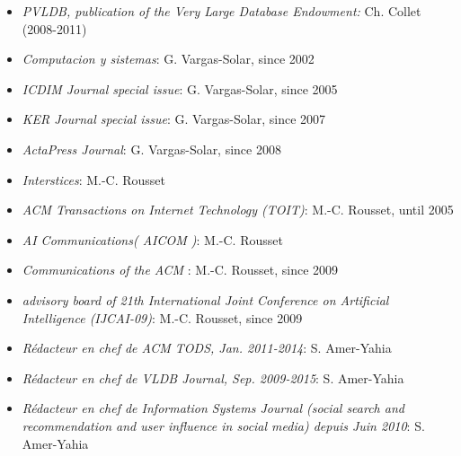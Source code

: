 \begin{itemize}
\setlength{\itemindent}{-0.5cm}
\setlength{\itemsep}{-0.1cm}
\item {\it PVLDB, publication of the Very Large Database Endowment:} Ch. Collet (2008-2011)

\item {\it Computacion y sistemas}: G. Vargas-Solar, since 2002

\item {\it ICDIM Journal special issue}: G. Vargas-Solar, since 2005

\item {\it KER Journal special issue}: G. Vargas-Solar, since 2007

\item {\it ActaPress Journal}: G. Vargas-Solar, since 2008

\item {\it Interstices}: M.-C. Rousset

\item {\it ACM Transactions on Internet Technology (TOIT)}: M.-C. Rousset,  until 2005

\item {\it AI Communications( AICOM )}: M.-C. Rousset

\item {\it Communications of the ACM }: M.-C. Rousset,  since 2009

\item {\it advisory board of 21th International Joint Conference on Artificial Intelligence (IJCAI-09)}: M.-C. Rousset,  since 2009

\item \emph{R\'edacteur en chef de ACM TODS, Jan. 2011-2014}:  S. Amer-Yahia

\item \emph{R\'edacteur en chef de VLDB Journal, Sep. 2009-2015}:  S. Amer-Yahia

\item \emph{R\'edacteur en chef de Information Systems Journal (social search and recommendation and user influence in social media) depuis Juin 2010}:  S. Amer-Yahia
    


\end{itemize}



